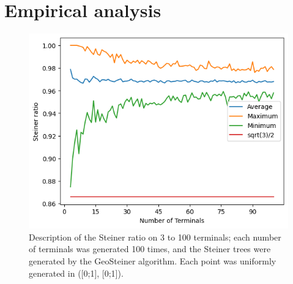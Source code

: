 \documentclass{mpaper}
\begin{document}

\section{Empirical analysis}

\begin{figure}
  \begin{center}
  \includegraphics[scale=0.5]{plot2.png}
  \end{center}
  \caption{\label{fig:1}Description of the Steiner ratio on 3 to 100 terminals; each number of terminals was generated 100 times, and the Steiner trees were generated by the GeoSteiner algorithm. Each point was uniformly generated in ([0;1], [0;1]). }
\end{figure}
\end{document}
